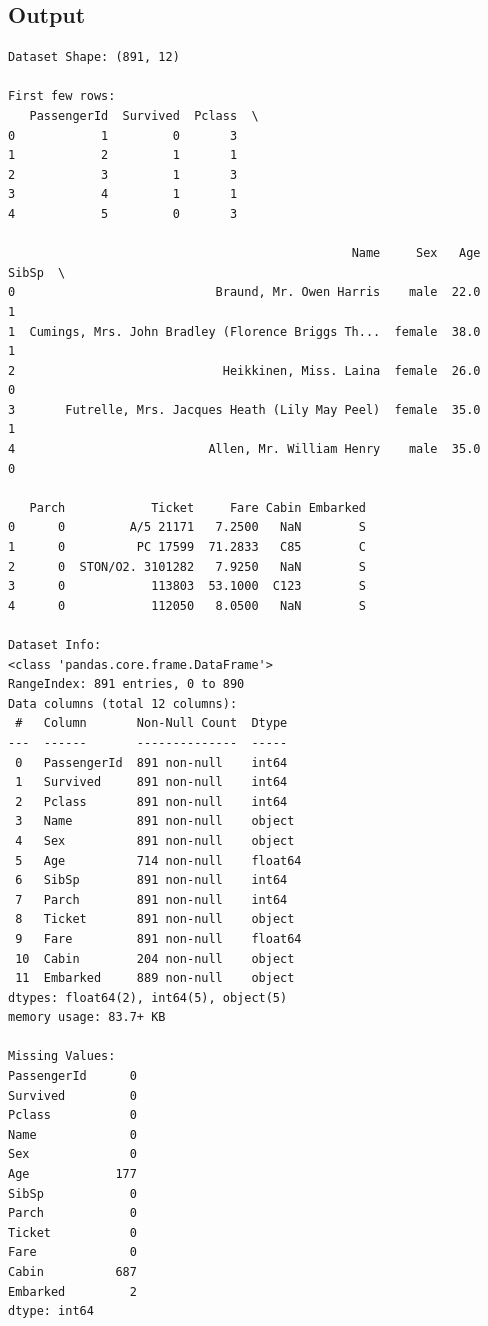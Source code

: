 \documentclass[12pt,a4paper]{article}
\begin{document}
\subsection{Output}
\begin{verbatim}
Dataset Shape: (891, 12)

First few rows:
   PassengerId  Survived  Pclass  \
0            1         0       3   
1            2         1       1   
2            3         1       3   
3            4         1       1   
4            5         0       3   

                                                Name     Sex   Age  SibSp  \
0                            Braund, Mr. Owen Harris    male  22.0      1   
1  Cumings, Mrs. John Bradley (Florence Briggs Th...  female  38.0      1   
2                             Heikkinen, Miss. Laina  female  26.0      0   
3       Futrelle, Mrs. Jacques Heath (Lily May Peel)  female  35.0      1   
4                           Allen, Mr. William Henry    male  35.0      0   

   Parch            Ticket     Fare Cabin Embarked  
0      0         A/5 21171   7.2500   NaN        S  
1      0          PC 17599  71.2833   C85        C  
2      0  STON/O2. 3101282   7.9250   NaN        S  
3      0            113803  53.1000  C123        S  
4      0            112050   8.0500   NaN        S  

Dataset Info:
<class 'pandas.core.frame.DataFrame'>
RangeIndex: 891 entries, 0 to 890
Data columns (total 12 columns):
 #   Column       Non-Null Count  Dtype  
---  ------       --------------  -----  
 0   PassengerId  891 non-null    int64  
 1   Survived     891 non-null    int64  
 2   Pclass       891 non-null    int64  
 3   Name         891 non-null    object 
 4   Sex          891 non-null    object 
 5   Age          714 non-null    float64
 6   SibSp        891 non-null    int64  
 7   Parch        891 non-null    int64  
 8   Ticket       891 non-null    object 
 9   Fare         891 non-null    float64
 10  Cabin        204 non-null    object 
 11  Embarked     889 non-null    object 
dtypes: float64(2), int64(5), object(5)
memory usage: 83.7+ KB

Missing Values:
PassengerId      0
Survived         0
Pclass           0
Name             0
Sex              0
Age            177
SibSp            0
Parch            0
Ticket           0
Fare             0
Cabin          687
Embarked         2
dtype: int64
\end{verbatim}
\end{document}
